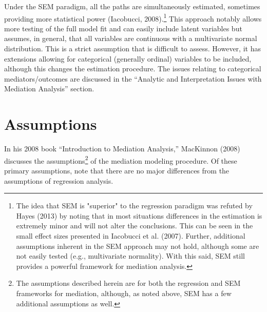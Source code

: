 \documentclass[]{DissertateUSU}
\let\rmarkdownfootnote\footnote%
\def\footnote{\protect\rmarkdownfootnote}
\begin{document}
Under the SEM paradigm, all the paths are simultaneously estimated,
sometimes providing more statistical power (Iacobucci,
2008).\footnote{The idea that SEM is "superior" to the regression paradigm was refuted by Hayes (2013) by noting that in most situations differences in the estimation is extremely minor and will not alter the conclusions. This can be seen in the small effect sizes presented in Iacobucci et al. (2007). Further, additional assumptions inherent in the SEM approach may not hold, although some are not easily tested (e.g., multivariate normality). With this said, SEM still provides a powerful framework for mediation analysis.}
This approach notably allows more testing of the full model fit and can
easily include latent variables but assumes, in general, that all
variables are continuous with a multivariate normal distribution. This
is a strict assumption that is difficult to assess. However, it has
extensions allowing for categorical (generally ordinal) variables to be
included, although this changes the estimation procedure. The issues
relating to categorical mediators/outcomes are discussed in the
``Analytic and Interpretation Issues with Mediation Analysis'' section.

\section{Assumptions}\label{assumptions}

In his 2008 book ``Introduction to Mediation Analysis,'' MacKinnon
(2008) discusses the
assumptions\footnote{The assumptions described herein are for both the regression and SEM frameworks for mediation, although, as noted above, SEM has a few additional assumptions as well.}
of the mediation modeling procedure. Of these primary assumptions, note
that there are no major differences from the assumptions of regression
analysis.
\end{document}
